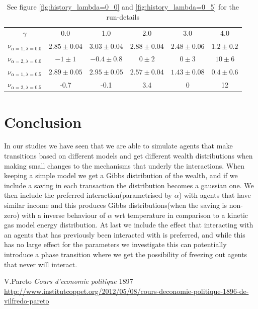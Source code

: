 \documentclass[a4paper,11pt]{article}
\begin{document}
{\begin{table}[h]
\caption{See figure \ref{fig:history_lambda=0_0} and \ref{fig:history_lambda=0_5} for the run-details}
\begin{center}
\begin{tabular}{c|c|c|c|c|c}
$\gamma$ & 0.0 & 1.0 & 2.0 & 3.0 & 4.0  \\
$\nu_{\alpha=1, \lambda=0.0}$ & $2.85\pm 0.04$ & $3.03\pm 0.04$ & $2.88\pm 0.04$ & $2.48\pm 0.06$ & $1.2\pm0.2$\\
$\nu_{\alpha=2, \lambda=0.0}$ & $-1 \pm 1$ & $-0.4\pm 0.8$ & $0\pm 2$ & $0\pm 3$ & $10\pm 6$ \\
$\nu_{\alpha=1, \lambda=0.5}$ & $2.89\pm 0.05$ & $2.95\pm 0.05$ & $2.57\pm 0.04$ & $1.43\pm 0.08$ &$0.4\pm0.6$  \\
$\nu_{\alpha=2, \lambda=0.5}$ & -0.7 & -0.1 & 3.4 & 0 & 12
\end{tabular}
\end{center}
\label{tab:hist}
\end{table}%




\section*{Conclusion}
In our studies we have seen that we are able to simulate agents that make transitions based on different models and get different wealth distributions when making small changes to the mechanisms that underly the interactions. When keeping a simple model we get a Gibbs distribution of the wealth, and if we include a saving in each transaction the distribution becomes a gaussian one. We then include the preferred interaction(parametrised by $\alpha$) with agents that have similar income and this produces Gibbs distributions(when the saving is non-zero) with a inverse behaviour of $\alpha$ wrt temperature in comparison to a kinetic gas model energy distribution. At last we include the effect that interacting with an agents that has previously been interacted with is preferred, and while this has no large effect for the parameters we investigate this can potentially introduce a phase transition where we get the possibility of freezing out agents that never will interact. 







\begin{thebibliography}{3}
			
	V.Pareto
	\emph{Cours d'economie politique}
	1897
	\url{http://www.institutcoppet.org/2012/05/08/cours-deconomie-politique-1896-de-vilfredo-pareto}
	

\end{thebibliography}}
\end{document}

